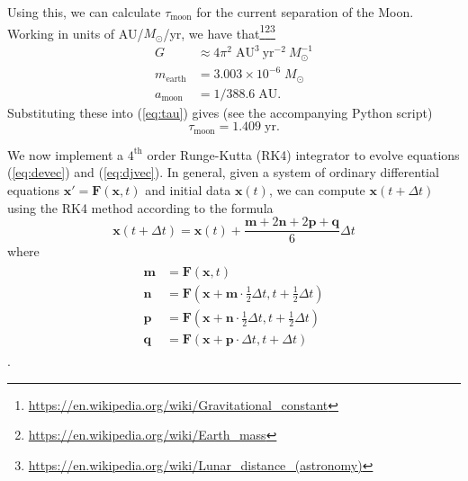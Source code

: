 \documentclass[10pt]{article}
\newcommand{\xvec}{\mathbf{x}}
\begin{document}
Using this, we can calculate $\tau_{\mathrm{moon}}$ for the current separation of the Moon. Working in units of AU/$M_\odot$/yr, we have that\footnote{\url{https://en.wikipedia.org/wiki/Gravitational\_constant}}\footnote{\url{https://en.wikipedia.org/wiki/Earth\_mass}}\footnote{\url{https://en.wikipedia.org/wiki/Lunar\_distance\_(astronomy)}}
\begin{align*}
    G &\approx 4 \pi^2 \; \mathrm{AU}^3 \: \mathrm{yr}^{-2} \: M_\odot^{-1} \\
    m_{\mathrm{earth}} &= 3.003 \times 10^{-6} \; M_\odot \\
    a_{\mathrm{moon}} &= 1/388.6 \; \mathrm{AU}.
\end{align*}
Substituting these into (\ref{eq:tau}) gives (see the accompanying Python script)
\[
    \tau_{\mathrm{moon}} = 1.409 \; \mathrm{yr}.
\]

We now implement a $4^\mathrm{th}$ order Runge-Kutta (RK4) integrator to evolve equations (\ref{eq:devec}) and (\ref{eq:djvec}). In general, given a system of ordinary differential equations $\xvec' = \mathbf{F}(\xvec, t)$ and initial data $\xvec(t)$, we can compute $\xvec(t + \Delta t)$ using the RK4 method according to the formula
\begin{equation} \label{eq:RK4}
    \xvec(t + \Delta t) = \xvec(t) + \frac{\mathbf{m} + 2\mathbf{n} + 2\mathbf{p} + \mathbf{q}}{6} \Delta t
\end{equation}
where
\begin{align}
\begin{split} \label{eq:RK4_derivatives}
    \mathbf{m} &= \mathbf{F} \left( \xvec, t \right) \\
    \mathbf{n} &= \mathbf{F} \left( \xvec + \textbf{m} \cdot \tfrac{1}{2} \Delta t, t + \tfrac{1}{2} \Delta t \right) \\
    \mathbf{p} &= \mathbf{F} \left( \xvec + \textbf{n} \cdot \tfrac{1}{2} \Delta t, t + \tfrac{1}{2} \Delta t \right) \\
    \mathbf{q} &= \mathbf{F} \left( \xvec + \textbf{p} \cdot \Delta t, t + \Delta t \right)
\end{split}
\end{align}
\parencite{hirsch2013}.

\printbibliography
\end{document}

